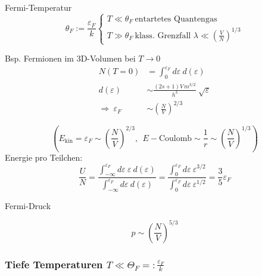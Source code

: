 Fermi-Temperatur
\begin{equation}
    \theta_F := \frac{\varepsilon_F}{k}\begin{cases}
        T\ll \theta_F \ \text{entartetes Quantengas}\\ T\gg \theta_F \ \text{klass. Grenzfall  } \lambda \ll \left( \frac{V}{N}\right)^{1/3}
    \end{cases}
\end{equation}

\begin{beispiel}{Bsp. Fermionen im 3D-Volumen bei $T \to 0$}
\begin{align}
    N(T=0)&= \int_0^{\varepsilon_F} d\varepsilon\ d(\varepsilon) \\
    d(\varepsilon) &\sim \frac{(2s+1) V\, m^{3/2}}{h^3} \ \sqrt{\varepsilon} \\
    \Rightarrow \ \varepsilon_F &\sim \left(\frac{N}{V}\right)^{2/3}
\end{align}

\begin{equation}
    \left(E_\text{kin} = \varepsilon_F \sim \left(\frac{N}{V} \right)^{2/3}, \ \ E-\text{Coulomb} \sim \frac{1}{r} \sim \left(\frac{N}{V}\right)^{1/3} \right)
\end{equation}
 Energie pro Teilchen:
 \begin{equation}
     \frac{U}{N} = \frac{\int_{-\infty}^{\varepsilon_F} d\varepsilon \ \varepsilon \  d(\varepsilon)}{\int_{-\infty}^{\varepsilon_F} d\varepsilon \  d(\varepsilon)} = \frac{\int_{0}^{\varepsilon_F} d\varepsilon \ \varepsilon^{3/2}}{\int_{0}^{\varepsilon_F} d\varepsilon \  \varepsilon^{1/2}} = \frac{3}{5 } \varepsilon_F
 \end{equation}


    Fermi-Druck

    \begin{equation}
        p \sim \left( \frac{N}{V}\right) ^{5/3}
    \end{equation}
\end{beispiel}

\subsubsection{Tiefe Temperaturen $ T\ll \Theta_F=: \frac{\varepsilon_F}{k}$}

